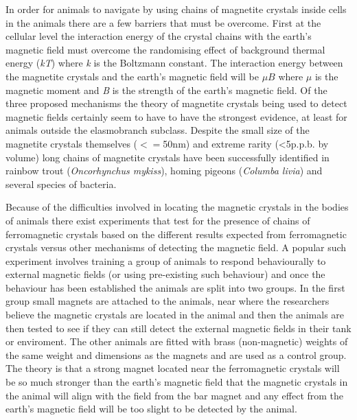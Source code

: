 \documentclass[12pt]{article}
\begin{document}
In order for animals to navigate by using chains of magnetite crystals inside cells in the animals there are a few barriers that must be overcome. First at the cellular level the interaction energy of the crystal chains with the earth's magnetic field must overcome the randomising effect of background thermal energy (\textit{kT}) where \textit{k} is the Boltzmann constant. The interaction energy between the magnetite crystals and the earth's magnetic field will be \textit{$\mu B$} where \textit{$\mu$} is the magnetic moment and \textit{B} is the strength of the earth's magnetic field\cite{Kirschvink:2001}.  Of the three proposed mechanisms the theory of magnetite crystals being used to detect magnetic fields certainly seem to have to have the strongest evidence, at least for animals outside the elasmobranch subclass. Despite the small size of the magnetite crystals themselves ($<=$50nm) and extreme rarity (\textless5p.p.b. by volume) long chains of magnetite crystals have been successfully identified in rainbow trout (\textit{Oncorhynchus mykiss}), homing pigeons (\textit{Columba livia}) and several species of bacteria\cite{Johnsen:2008}\cite{Johnsen:2005}\cite{Walker:2003}.

Because of the difficulties involved in locating the magnetic crystals in the bodies of animals there exist experiments that test for the presence of chains of ferromagnetic crystals based on the different results expected from ferromagnetic crystals versus other mechanisms of detecting the magnetic field. A popular such experiment involves training a group of animals to respond behaviourally to external magnetic fields (or using pre-existing such behaviour) and once the behaviour has been established the animals are split into two groups. In the first group small magnets are attached to the animals, near where the researchers believe the magnetic crystals are located in the animal and then the animals are then tested to see if they can still detect the external magnetic fields in their tank or enviroment. The other animals are fitted with brass (non-magnetic) weights of the same weight and dimensions as the magnets and are used as a control group. The theory is that a strong magnet located near the ferromagnetic crystals will be so much stronger than the earth's magnetic field that the magnetic crystals in the animal will align with the field from the bar magnet and any effect from the earth's magnetic field will be too slight to be detected by the animal\cite{Walker:2003}. 
\end{document}
